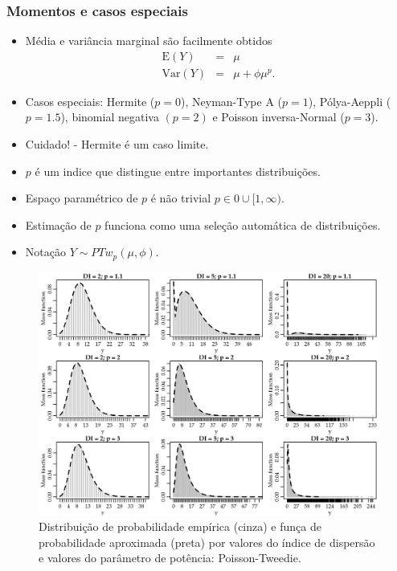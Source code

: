 \documentclass[10pt, aspectratio=169]{beamer}\usepackage[]{graphicx}\usepackage[]{color}
\begin{document}
\begin{frame}[c]
\frametitle{Momentos e casos especiais}
\begin{itemize}
\item Média e variância marginal são facilmente obtidos
\begin{eqnarray}
\label{marginalGaussian}
\mathrm{E}(Y) &=& \mu \nonumber    \\
\mathrm{Var}(Y) &=& \mu + \phi\mu^p. \nonumber
\end{eqnarray}
\item Casos especiais: Hermite ($p=0$), Neyman-Type A ($p=1$), 
      P\'olya-Aeppli ($p=1.5$), binomial negativa $(p=2)$ e Poisson inversa-Normal ($p=3$).
\item Cuidado! - Hermite é um caso limite.
\item $p$ é um indice que distingue entre importantes distribuições.
\item Espaço paramétrico de $p$ é não trivial $p \in {0}\cup[1,\infty)$.
\item Estimação de $p$ funciona como uma seleção automática de distribuições.
\item Notação $Y \sim PTw_p(\mu, \phi)$.
\end{itemize}
\end{frame}

\begin{frame}[fragile]
\begin{figure}[h]
\includegraphics[scale=0.5]{images/PoissonTweedie.png}
\caption{Distribuição de probabilidade empírica (cinza) e funça de 
probabilidade aproximada (preta) por valores do
índice de dispersão e valores do parâmetro de potência: Poisson-Tweedie.}
\label{Fig3}
\centering
\end{figure}
\end{frame}
\end{document}
